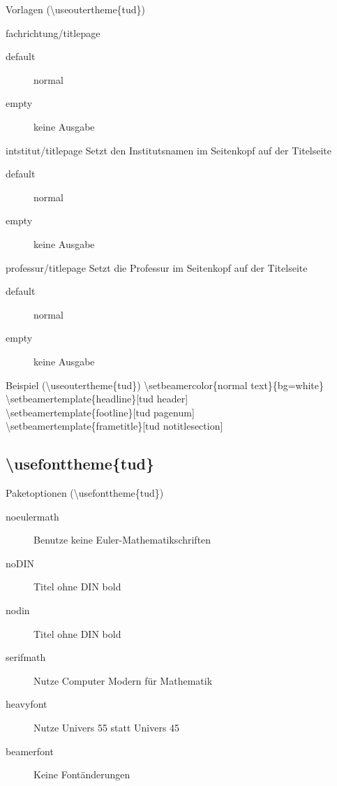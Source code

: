 \documentclass[presentation,t]{beamer}
\begin{document}
\begin{frame}[allowframebreaks]{Vorlagen (\textbackslash useoutertheme\{tud\})}
\begin{block}{fachrichtung/titlepage}
\begin{description}
\item[{default}] normal
\item[{empty}] keine Ausgabe
\end{description}
\end{block}
\begin{block}{intstitut/titlepage}
Setzt den Institutsnamen im Seitenkopf auf der Titelseite

\begin{description}
\item[{default}] normal
\item[{empty}] keine Ausgabe
\end{description}
\end{block}

\begin{block}{professur/titlepage}
Setzt die Professur im Seitenkopf auf der Titelseite

\begin{description}
\item[{default}] normal
\item[{empty}] keine Ausgabe
\end{description}
\end{block}
\end{frame}

\begin{frame}[label={sec:orga958255}]{Beispiel (\textbackslash useoutertheme\{tud\})}
\textbackslash setbeamercolor\{normal text\}\{bg=white\}\\
\textbackslash setbeamertemplate\{headline\}[tud header]\\
\textbackslash setbeamertemplate\{footline\}[tud pagenum]\\
\textbackslash setbeamertemplate\{frametitle\}[tud notitlesection]\\
\end{frame}


\subsection{\textbackslash usefonttheme\{tud\}}
\label{sec:org948f5ed}

\begin{frame}[label={sec:orgf1f9510}]{Paketoptionen (\textbackslash usefonttheme\{tud\})}
\begin{description}
\item[{noeulermath}] Benutze keine Euler-Mathematikschriften
\item[{noDIN}] Titel ohne DIN bold
\item[{nodin}] Titel ohne DIN bold
\item[{serifmath}] Nutze Computer Modern für Mathematik
\item[{heavyfont}] Nutze Univers 55 statt Univers 45
\item[{beamerfont}] Keine Fontänderungen
\end{description}
\end{frame}
\end{document}
